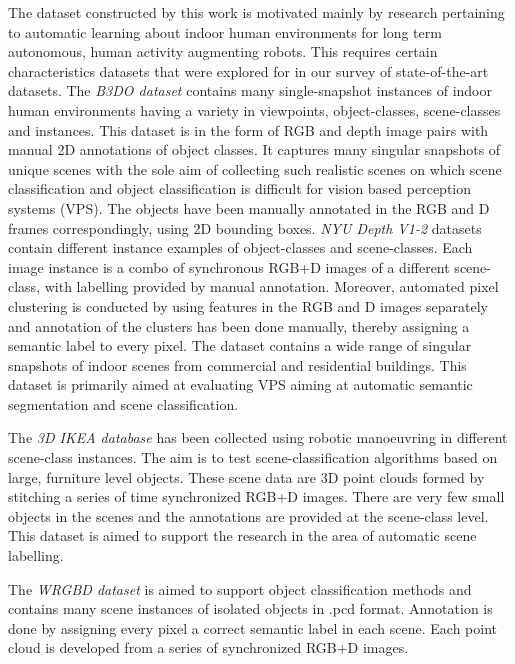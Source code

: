 \documentclass[letterpaper, 10 pt, conference]{ieeeconf}  %
\begin{document}
The dataset constructed by this work is motivated mainly by research pertaining to automatic learning about indoor human environments for long term autonomous, human activity augmenting robots. This requires certain characteristics datasets that were explored for in our survey of state-of-the-art datasets. The \textit{B3DO dataset} \cite{Janoch:ICCV2011} contains many single-snapshot instances of indoor human environments having a variety in viewpoints, object-classes, scene-classes and instances. This dataset is in the form of RGB and depth image pairs with manual 2D annotations of object classes. It captures many singular snapshots of unique scenes with the sole aim of collecting such realistic scenes on which scene classification and object classification is difficult for vision based perception systems (VPS). The objects have been manually annotated in the RGB and D frames correspondingly, using 2D bounding boxes.
\textit{NYU Depth V1-2} \cite{Silberman:ECCV2012} datasets contain different instance examples of object-classes and scene-classes. Each image instance is a combo of synchronous RGB+D images of a different scene-class, with labelling provided by manual annotation. Moreover, automated pixel clustering is conducted by using features in the RGB and D images separately and annotation of the clusters has been done manually, thereby assigning a semantic label to every pixel. The dataset contains a wide range of singular snapshots of indoor scenes from commercial and residential buildings. This dataset is primarily aimed at evaluating VPS aiming at automatic semantic segmentation and scene classification.

The \textit{3D IKEA database} \cite{Swadzba:RAS2012} has been collected using robotic manoeuvring in different scene-class instances. The aim is to test scene-classification algorithms based on large, furniture level objects. These scene data are 3D point clouds formed by stitching a series of time synchronized RGB+D images. There are very few small objects in the scenes and the annotations are provided at the scene-class level. This dataset is aimed to support the research in the area of automatic scene labelling.

The \textit{WRGBD dataset} \cite{Lai:ICRA2011} is aimed to support object classification methods and contains many scene instances of isolated objects in .pcd format. Annotation is done by assigning every pixel a correct semantic label in each scene. Each point cloud is developed from a series of synchronized RGB+D images.
\end{document}
